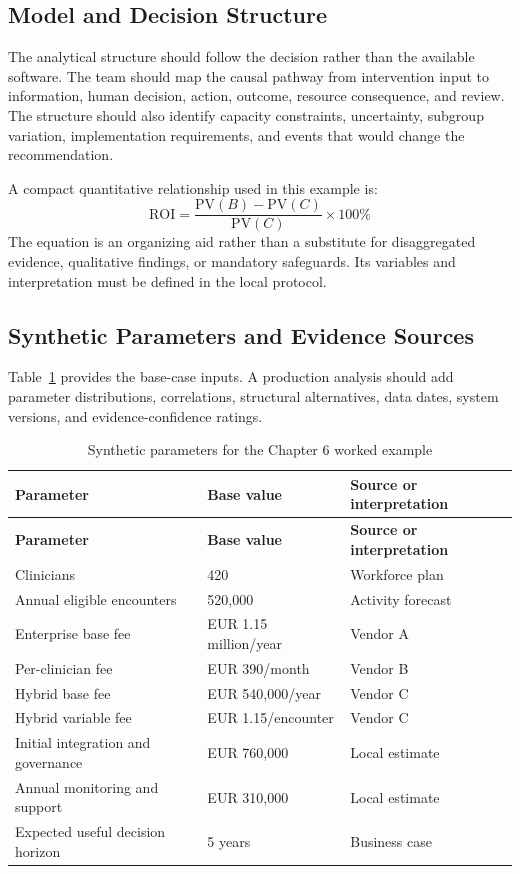 \subsection{Model and Decision Structure}
The analytical structure should follow the decision rather than the available
software. The team should map the causal pathway from intervention input to
information, human decision, action, outcome, resource consequence, and review.
The structure should also identify capacity constraints, uncertainty, subgroup
variation, implementation requirements, and events that would change the
recommendation.

A compact quantitative relationship used in this example is:
\begin{equation}
\mathrm{ROI}=\frac{\mathrm{PV}(B)-\mathrm{PV}(C)}{\mathrm{PV}(C)}\times100\%
\label{eq:comp-ch06-key-relationship}
\end{equation}
The equation is an organizing aid rather than a substitute for disaggregated evidence,
qualitative findings, or mandatory safeguards. Its variables and interpretation must
be defined in the local protocol.

\subsection{Synthetic Parameters and Evidence Sources}
Table~\ref{tab:comp-ch06-parameters} provides the base-case inputs. A
production analysis should add parameter distributions, correlations, structural
alternatives, data dates, system versions, and evidence-confidence ratings.

\begin{longtable}{@{}p{}p{}p{}@{}}
\caption{Synthetic parameters for the Chapter 6 worked example}
\label{tab:comp-ch06-parameters}\\
\toprule
\textbf{Parameter} & \textbf{Base value} & \textbf{Source or interpretation} \\
\midrule
\endfirsthead
\toprule
\textbf{Parameter} & \textbf{Base value} & \textbf{Source or interpretation} \\
\midrule
\endhead
\bottomrule
\endlastfoot
Clinicians & 420 & Workforce plan \\
Annual eligible encounters & 520,000 & Activity forecast \\
Enterprise base fee & EUR 1.15 million/year & Vendor A \\
Per-clinician fee & EUR 390/month & Vendor B \\
Hybrid base fee & EUR 540,000/year & Vendor C \\
Hybrid variable fee & EUR 1.15/encounter & Vendor C \\
Initial integration and governance & EUR 760,000 & Local estimate \\
Annual monitoring and support & EUR 310,000 & Local estimate \\
Expected useful decision horizon & 5 years & Business case \\
\end{longtable}

